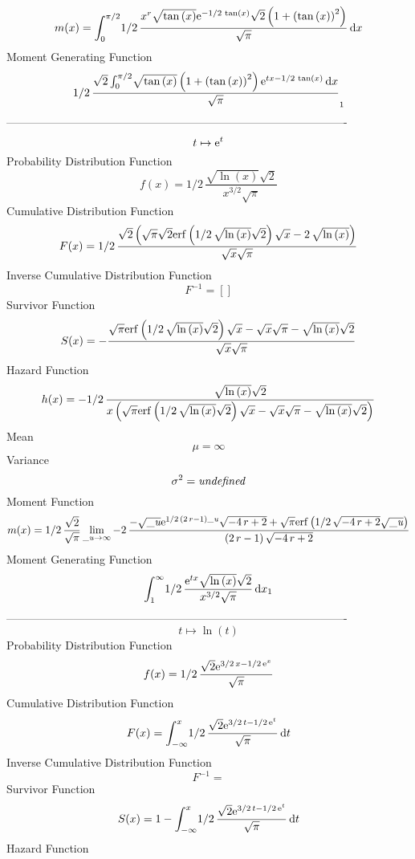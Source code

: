 \documentclass[12pt]{article}
\begin{document}
 $$ m(x) = \int_{0}^{\pi/2}\!1/2\,{\frac {{x}^{r}\sqrt {\tan \left( x \right) }{
{\rm e}^{-1/2\,\tan \left( x \right) }}\sqrt {2} \left( 1+ \left( \tan
 \left( x \right)  \right) ^{2} \right) }{\sqrt {\pi}}}\,{\rm d}x
$$ Moment Generating Function 
 $$1/2\,{\frac {\sqrt {2}\int_{0}^{\pi/2}\!\sqrt {\tan \left( x \right) }
 \left( 1+ \left( \tan \left( x \right)  \right) ^{2} \right) {{\rm e}
^{tx-1/2\,\tan \left( x \right) }}\,{\rm d}x}{\sqrt {\pi}}}_{{1}}
$$-------------------------------------------------------------------------------------------  \\$$t\mapsto {{\rm e}^{t}}
$$Probability Distribution Function 
$$  f(x)=1/2\,{\frac {\sqrt {\ln  \left( x \right) }\sqrt {2}}{{x}^{3/2}\sqrt {
\pi}}}
$$Cumulative Distribution Function  
 $$F(x)=1/2\,{\frac {\sqrt {2} \left( \sqrt {\pi}\sqrt {2}{\rm erf} \left(1/2
\,\sqrt {\ln  \left( x \right) }\sqrt {2}\right)\sqrt {x}-2\,\sqrt {
\ln  \left( x \right) } \right) }{\sqrt {x}\sqrt {\pi}}}
$$ Inverse Cumulative Distribution Function 
  $$F^{-1} = []
$$Survivor Function 
 $$ S(x)=-{\frac {\sqrt {\pi}{\rm erf} \left(1/2\,\sqrt {\ln  \left( x \right) 
}\sqrt {2}\right)\sqrt {x}-\sqrt {x}\sqrt {\pi}-\sqrt {\ln  \left( x
 \right) }\sqrt {2}}{\sqrt {x}\sqrt {\pi}}}
$$ Hazard Function 
 $$ h(x)=-1/2\,{\frac {\sqrt {\ln  \left( x \right) }\sqrt {2}}{x \left( \sqrt 
{\pi}{\rm erf} \left(1/2\,\sqrt {\ln  \left( x \right) }\sqrt {2}
\right)\sqrt {x}-\sqrt {x}\sqrt {\pi}-\sqrt {\ln  \left( x \right) }
\sqrt {2} \right) }}
$$Mean 
 $$ \mu=\infty 
$$ Variance 
 $$ \sigma^2 = {\it undefined}
$$Moment Function 
 $$ m(x) = 1/2\,{\frac {\sqrt {2}}{\sqrt {\pi}}\lim _{{\it \_u}\rightarrow 
\infty }-2\,{\frac {-\sqrt {{\it \_u}}{{\rm e}^{1/2\, \left( 2\,r-1
 \right) {\it \_u}}}\sqrt {-4\,r+2}+\sqrt {\pi}{\rm erf} \left(1/2\,
\sqrt {-4\,r+2}\sqrt {{\it \_u}}\right)}{ \left( 2\,r-1 \right) \sqrt 
{-4\,r+2}}}}
$$ Moment Generating Function 
 $$\int_{1}^{\infty }\!1/2\,{\frac {{{\rm e}^{tx}}\sqrt {\ln  \left( x
 \right) }\sqrt {2}}{{x}^{3/2}\sqrt {\pi}}}\,{\rm d}x_{{1}}
$$-------------------------------------------------------------------------------------------  \\$$t\mapsto \ln  \left( t \right) 
$$Probability Distribution Function 
$$  f(x)=1/2\,{\frac {\sqrt {2}{{\rm e}^{3/2\,x-1/2\,{{\rm e}^{x}}}}}{\sqrt {
\pi}}}
$$Cumulative Distribution Function  
 $$F(x)=\int_{-\infty }^{x}\!1/2\,{\frac {\sqrt {2}{{\rm e}^{3/2\,t-1/2\,{
{\rm e}^{t}}}}}{\sqrt {\pi}}}\,{\rm d}t
$$ Inverse Cumulative Distribution Function 
  $$F^{-1} = $$Survivor Function 
 $$ S(x)=1-\int_{-\infty }^{x}\!1/2\,{\frac {\sqrt {2}{{\rm e}^{3/2\,t-1/2\,{
{\rm e}^{t}}}}}{\sqrt {\pi}}}\,{\rm d}t
$$ Hazard Function 
\end{document}
